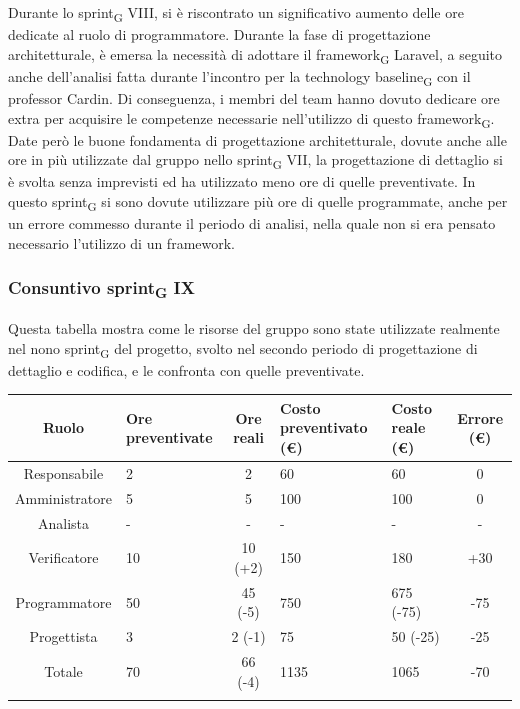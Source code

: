 Durante lo sprint\textsubscript{G} VIII, si è riscontrato un significativo aumento delle ore dedicate al ruolo di programmatore. 
Durante la fase di progettazione architetturale, è emersa la necessità di adottare il framework\textsubscript{G} Laravel, a seguito anche dell'analisi fatta durante l'incontro per la technology baseline\textsubscript{G} con il professor Cardin. Di conseguenza, i membri del team hanno dovuto dedicare ore extra per acquisire le competenze necessarie nell'utilizzo di questo framework\textsubscript{G}.
Date però le buone fondamenta di progettazione architetturale, dovute anche alle ore in più utilizzate dal gruppo nello sprint\textsubscript{G} VII, la progettazione di dettaglio si è svolta senza imprevisti ed ha utilizzato meno ore di quelle preventivate.
In questo sprint\textsubscript{G} si sono dovute utilizzare più ore di quelle programmate, anche per un errore commesso durante il periodo di analisi, nella quale non si era pensato necessario l'utilizzo di un framework.

\newpage
\subsubsection{Consuntivo sprint\textsubscript{G} IX}

Questa tabella mostra come le risorse del gruppo sono state utilizzate realmente nel nono sprint\textsubscript{G} del progetto, svolto nel secondo periodo di progettazione di dettaglio e codifica, e le confronta con quelle preventivate.

\setlength\extrarowheight{5pt}
\begin{tabularx}{\textwidth}{|c|XcXX|c|}
	\hline
	\rowcolor{white}
	\textbf{Ruolo} & \textbf{Ore preventivate} & \textbf{Ore reali} & \textbf{Costo preventivato (€)} & \textbf{Costo reale (€)} & \textbf{Errore (€)} \\
	\hline
	Responsabile & 2 & 2 & 60 & 60 & 0 \\
	Amministratore & 5 & 5 & 100 & 100 & 0 \\
	Analista & - & - & - & - & - \\
	Verificatore & 10 & 10 (+2) & 150 & 180 & +30 \\
	Programmatore & 50 & 45 (-5) & 750 & 675 (-75) & -75 \\
	Progettista & 3 & 2 (-1) & 75 & 50 (-25) & -25 \\
	\hline
	Totale & 70 & 66 (-4) & 1135 & 1065 & -70 \\
	\hline
	\rowcolor{white}
	\caption{Consuntivo ore e costi per ruolo del nono sprint\textsubscript{G}}
\end{tabularx}
